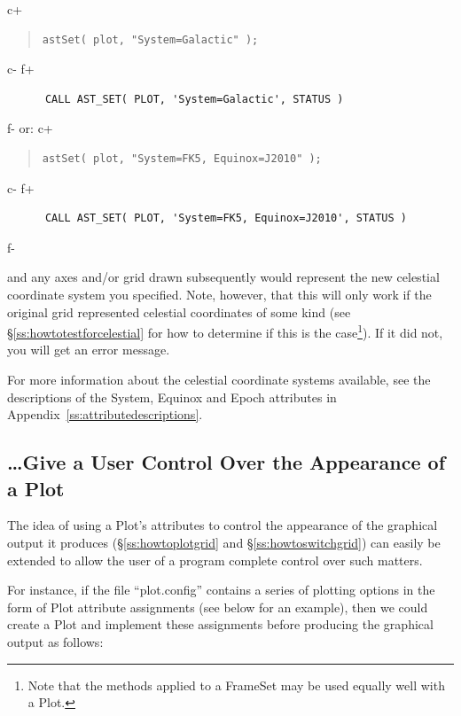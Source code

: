 \documentclass[twoside,11pt]{article}
\newcommand{\appref}[1]{Appendix~\ref{#1}}
\newcommand{\secref}[1]{\S\ref{#1}}
\newcommand{\appref}[1]{\ref{#1}}
\newcommand{\secref}[1]{\ref{#1}}
\begin{document}
c+
\begin{quote}
\small
\begin{verbatim}
astSet( plot, "System=Galactic" );
\end{verbatim}
\normalsize
\end{quote}
c-
f+
\small
\begin{verbatim}
      CALL AST_SET( PLOT, 'System=Galactic', STATUS )
\end{verbatim}
\normalsize
f-
or:
c+
\begin{quote}
\small
\begin{verbatim}
astSet( plot, "System=FK5, Equinox=J2010" );
\end{verbatim}
\normalsize
\end{quote}
c-
f+
\small
\begin{verbatim}
      CALL AST_SET( PLOT, 'System=FK5, Equinox=J2010', STATUS )
\end{verbatim}
\normalsize
f-

and any axes and/or grid drawn subsequently would represent the new
celestial coordinate system you specified.  Note, however, that this
will only work if the original grid represented celestial coordinates
of some kind (see \secref{ss:howtotestforcelestial} for how to
determine if this is the case\footnote{Note that the methods applied
to a FrameSet may be used equally well with a Plot.}). If it did not,
you will get an error message.

For more information about the celestial coordinate systems available,
see the descriptions of the System, Equinox and Epoch attributes in
\appref{ss:attributedescriptions}.

\subsection{\ldots Give a User Control Over the Appearance of a Plot}

The idea of using a Plot's attributes to control the appearance of the
graphical output it produces (\secref{ss:howtoplotgrid} and
\secref{ss:howtoswitchgrid}) can easily be extended to allow the user
of a program complete control over such matters.

For instance, if the file ``plot.config'' contains a series of
plotting options in the form of Plot attribute assignments (see below
for an example), then we could create a Plot and implement these
assignments before producing the graphical output as follows:
\end{document}
